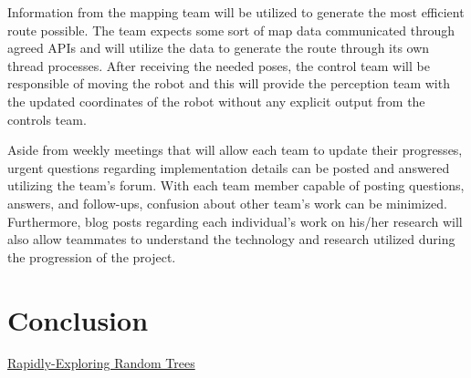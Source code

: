 \documentclass[titlepage]{article}
\begin{document}
Information from the mapping team will be utilized to generate the most efficient route possible. The team expects some sort of map data communicated through agreed APIs and will utilize the data to generate the route through its own thread processes. After receiving the needed poses, the control team will be responsible of moving the robot and this will provide the perception team with the updated coordinates of the robot without any explicit output from the controls team.   

Aside from weekly meetings that will allow each team to update their progresses, urgent questions regarding implementation details can be posted and answered utilizing the team’s forum. With each team member capable of posting questions, answers, and follow-ups, confusion about other team’s work can be minimized. Furthermore, blog posts regarding each individual’s work on his/her research will also allow teammates to understand the technology and research utilized during the progression of the project.
\section{Conclusion}
\begin{thebibliography}{20}
 \href{http://msl.cs.uiuc.edu/rrt/papers.html}{Rapidly-Exploring Random Trees}
\end{thebibliography}
\end{document}
